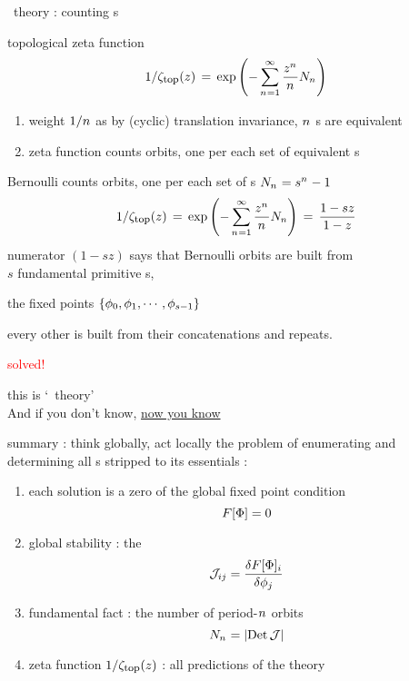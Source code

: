 \begin{frame}{\po\ theory : counting {\lattstate}s}

\begin{block}{topological zeta function}
\[
1/\zeta_{\mbox{\footnotesize top}} (z)
 \,=\,  \exp \left(-\sum_{{n_{}}=1}^\infty
\frac{z^{n_{}}}{{n_{}}} N_{n_{}}
         \right)
\] %
\end{block}
        \begin{enumerate}
              \item
weight ${1}/{{n_{}}}$
as by (cyclic) translation invariance, ${n_{}}$ {\lattstate}s are
equivalent
              \item
zeta function counts {\color{blue} orbits}, one per each set of equivalent
{\lattstate}s
            \end{enumerate}
\end{frame} %

\begin{frame}{Bernoulli \tzeta}
counts {\color{blue} orbits},
one per each set of {\lattstate}s $N_{n_{}}=s^{{n_{}}} - 1$
\[
1/\zeta_{\mbox{\footnotesize top}} (z)
 \,=\,  \exp \left(-\sum_{{n_{}}=1}^\infty
\frac{z^{n_{}}}{{n_{}}} N_n
         \right)
\,=\,
\frac{1 -  {s}z}{1 - z}
\] %
numerator $(1 - {s}z)$ says that Bernoulli orbits are built from \\
$s$
fundamental {\color{blue}primitive} {\lattstate}s,

\hfill
the fixed points
$\{\phi_0,\phi_1,\cdots,\phi_{s-1}\}$
\medskip

every other {\lattstate} is
built from their concatenations and repeats.

\vfill
\hfill {\Huge \textcolor{red}{solved!}}
\vfill

{\color{blue}this is `\po\ theory'}
\\
 And if you don't know,
{\underline{now you know}}
\end{frame} %

\begin{frame}{summary : think globally, act locally}
\bigskip
the problem of enumerating and determining all {\color{blue}{\lattstate}s}
stripped to its essentials :
\bigskip
\begin{enumerate}
              \item
each solution is a zero of the global {\color{blue}fixed point} condition
\[
F[\Phi] = 0
\]
              \item
{\color{blue}global stability} :  the {\jacobianOrb}
\[
{\cal J}_{ij} =\frac{\delta F[\Phi]_i}{\delta \phi_j}
\]
              \item
{\color{blue}fundamental fact} : the number of period-${n_{}}$ orbits
\[
N_{n_{}} = |\mbox{\rm Det}\,{\cal J}|
\]

              \item
{\color{blue}zeta function} $1/\zeta_{\mbox{\footnotesize top}} (z)$ : all predictions of the theory
            \end{enumerate}
\end{frame} %

